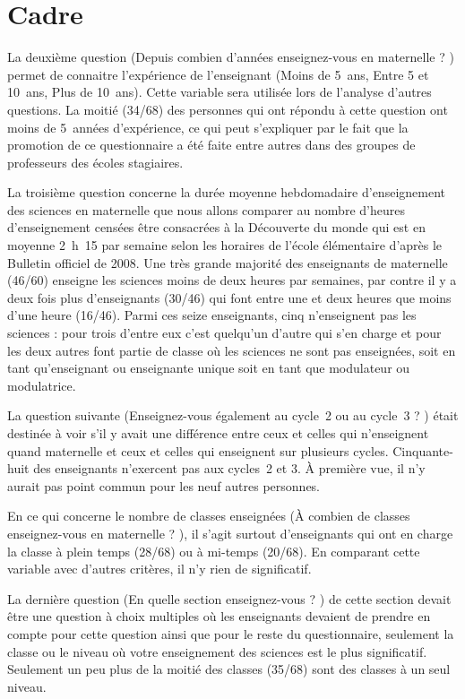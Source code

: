 \section{Cadre}
La deuxième question (\og Depuis combien d’années enseignez-vous en maternelle ? \fg{}) permet de connaitre l’expérience de l’enseignant (Moins de 5~ans, Entre 5 et 10~ans, Plus de 10~ans). Cette variable sera utilisée lors de l’analyse d’autres questions. La moitié (34/68) des personnes qui ont répondu à cette question ont moins de 5~années d’expérience, ce qui peut s’expliquer par le fait que la promotion de ce questionnaire a été faite entre autres dans des groupes de professeurs des écoles stagiaires.

La troisième question concerne la durée moyenne hebdomadaire d’enseignement des sciences en maternelle que nous allons comparer au nombre d’heures d’enseignement censées être consacrées à la \og Découverte du monde \fg{} qui est en moyenne 2~h~15 par semaine selon les horaires de l’école élémentaire d’après le Bulletin officiel de 2008. Une très grande majorité des enseignants de maternelle (46/60) enseigne les sciences moins de deux heures par semaines, par contre il y a deux fois plus d’enseignants (30/46) qui font entre une et deux heures que moins d’une heure (16/46). Parmi ces seize enseignants, cinq n’enseignent pas les sciences : pour trois d’entre eux c’est quelqu’un d’autre qui s’en charge et pour les deux autres font partie de classe où les sciences ne sont pas enseignées, soit en tant qu’enseignant ou enseignante unique soit en tant que modulateur ou modulatrice.

La question suivante (\og Enseignez-vous également au cycle~2 ou au cycle~3 ? \fg{}) était destinée à voir s’il y avait une différence entre ceux et celles qui n’enseignent quand maternelle et ceux et celles qui enseignent sur plusieurs cycles. Cinquante-huit des enseignants n’exercent pas aux cycles~2 et 3. À première vue, il n’y aurait pas point commun pour les neuf autres personnes.

En ce qui concerne le nombre de classes enseignées (\og À combien de classes enseignez-vous en maternelle ? \fg{}), il s’agit surtout d’enseignants qui ont en charge la classe à plein temps (28/68) ou à mi-temps (20/68). En comparant cette variable avec d’autres critères, il n’y rien de significatif.

La dernière question (\og En quelle section enseignez-vous ? \fg{}) de cette section devait être une question à choix multiples où les enseignants devaient de prendre en compte pour cette question ainsi que pour le reste du questionnaire, seulement la classe ou le niveau où votre enseignement des sciences est le plus significatif. Seulement un peu plus de la moitié des classes (35/68) sont des classes à un seul niveau.


